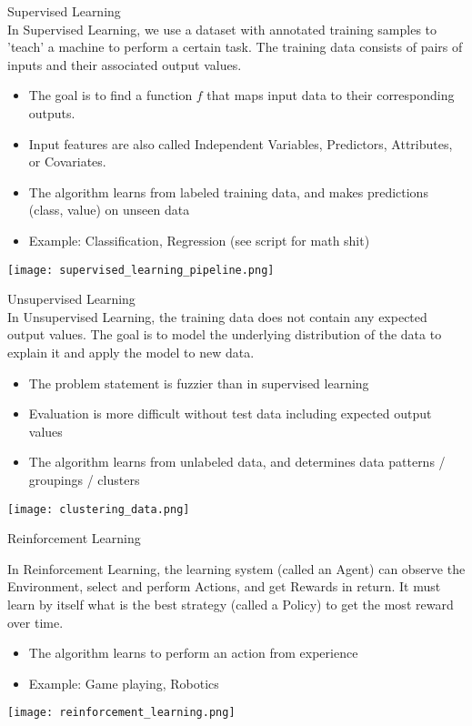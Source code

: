 \begin{concept}{Supervised Learning}\\
    In Supervised Learning, we use a dataset with annotated training samples to 'teach' a machine to perform a certain task. The training data consists of pairs of inputs and their associated output values.
    \begin{itemize}
        \item The goal is to find a function $f$ that maps input data to their corresponding outputs.
        \item Input features are also called Independent Variables, Predictors, Attributes, or Covariates.
        \item The algorithm learns from labeled training data, and makes predictions (class, value) on unseen data
        \item Example: Classification, Regression (see script for math shit)
    \end{itemize}

    \texttt{[image: supervised\_learning\_pipeline.png]}
\end{concept}

\begin{concept}{Unsupervised Learning}\\
    In Unsupervised Learning, the training data does not contain any expected output values. The goal is to model the underlying distribution of the data to explain it and apply the model to new data.
    \begin{itemize}
        \item The problem statement is fuzzier than in supervised learning
        \item Evaluation is more difficult without test data including expected output values
        \item The algorithm learns from unlabeled data, and determines data patterns / groupings / clusters
    \end{itemize}

    \texttt{[image: clustering\_data.png]}
\end{concept}

\begin{concept}{Reinforcement Learning}

    \begin{minipage}{0.6\linewidth}
    In Reinforcement Learning, the learning system (called an Agent) can observe the Environment, select and perform Actions, and get Rewards in return. It must learn by itself what is the best strategy (called a Policy) to get the most reward over time.
    \begin{itemize}
        \item The algorithm learns to perform an action from experience
        \item Example: Game playing, Robotics
    \end{itemize}
    \end{minipage}
    \begin{minipage}{0.38\linewidth}
    \texttt{[image: reinforcement\_learning.png]}
    \end{minipage}
\end{concept}

